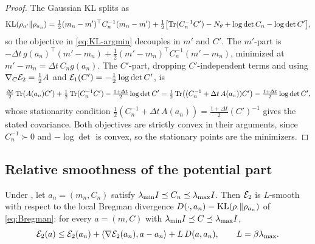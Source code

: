 \begin{proof}
    The Gaussian KL splits as
    \begin{equation*}
        \mathrm{KL}(\rho_{a'}\|\rho_{a_n})
        =\tfrac12(m_n-m')^\top C_n^{-1}(m_n-m')
        +\tfrac12\bigl[\operatorname{Tr}(C_n^{-1}C')-N_\theta+\log\det C_n-\log\det C'\bigr],
    \end{equation*}
    so the objective in \eqref{eq:KL-argmin} decouples in $m'$ and $C'$. The $m'$-part is
    $-\Delta t\,g(a_n)^\top(m'-m_n)+\tfrac12(m'-m_n)^\top C_n^{-1}(m'-m_n)$, minimized at
    $m'-m_n=\Delta t\,C_ng(a_n)$. The $C'$-part, dropping $C'$-independent terms and using
    $\nabla_C\mathcal{E}_2=\tfrac12A$ and $\mathcal{E}_1(C')=-\tfrac12\log\det C'$, is
    \begin{equation*}
        \tfrac{\Delta t}2\operatorname{Tr}(A(a_n)C')+\tfrac12\operatorname{Tr}(C_n^{-1}C')
        -\tfrac{1+\Delta t}2\log\det C'
        =\tfrac12\operatorname{Tr}\bigl((C_n^{-1}+\Delta t\,A(a_n))C'\bigr)
        -\tfrac{1+\Delta t}2\log\det C',
    \end{equation*}
    whose stationarity condition
    $\tfrac12(C_n^{-1}+\Delta t\,A(a_n))=\tfrac{1+\Delta t}2(C')^{-1}$ gives the stated
    covariance. Both objectives are strictly convex in their arguments, since $C_n^{-1}\succ0$
    and $-\log\det$ is convex, so the stationary points are the minimizers.
\end{proof}

\subsection{Relative smoothness of the potential part}

\begin{proposition}\label{prop:smooth-Bregman}
    Under , let $a_n=(m_n,C_n)$ satisfy
    $\lambda_{\min}I\preceq C_n\preceq\lambda_{\max}I$. Then $\mathcal{E}_2$ is $L$-smooth with
    respect to the local Bregman divergence $D(\cdot,a_n)=\mathrm{KL}(\rho_\cdot\|\rho_{a_n})$ of
    \eqref{eq:Bregman}: for every $a=(m,C)$ with
    $\lambda_{\min}I\preceq C\preceq\lambda_{\max}I$,
    \begin{equation*}
        \mathcal{E}_2(a)\leq\mathcal{E}_2(a_n)+\left\langle \nabla\mathcal{E}_2(a_n),a-a_n\right\rangle+L\,D(a,a_n),
        \qquad
        L=\beta\lambda_{\max}.
    \end{equation*}
\end{proposition}

